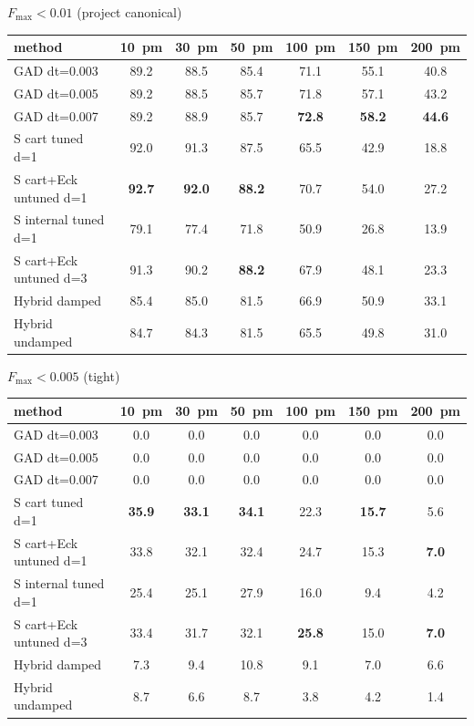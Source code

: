 \documentclass[11pt]{article}
\begin{document}
\begin{center}\footnotesize
\textbf{$F_\mathrm{max}<0.01$} (project canonical)\\[0.3em]
\begin{tabular}{l|cccccc}
\toprule
\textbf{method} & \textbf{10~pm} & \textbf{30~pm} & \textbf{50~pm} & \textbf{100~pm} & \textbf{150~pm} & \textbf{200~pm} \\
\midrule
GAD dt=0.003                   & 89.2 & 88.5 & 85.4 & 71.1 & 55.1 & 40.8 \\
GAD dt=0.005                   & 89.2 & 88.5 & 85.7 & 71.8 & 57.1 & 43.2 \\
GAD dt=0.007                   & 89.2 & 88.9 & 85.7 & \textbf{72.8} & \textbf{58.2} & \textbf{44.6} \\
\midrule
S cart tuned d=1               & 92.0 & 91.3 & 87.5 & 65.5 & 42.9 & 18.8 \\
S cart+Eck untuned d=1         & \textbf{92.7} & \textbf{92.0} & \textbf{88.2} & 70.7 & 54.0 & 27.2 \\
S internal tuned d=1           & 79.1 & 77.4 & 71.8 & 50.9 & 26.8 & 13.9 \\
S cart+Eck untuned d=3         & 91.3 & 90.2 & \textbf{88.2} & 67.9 & 48.1 & 23.3 \\
\midrule
Hybrid damped                  & 85.4 & 85.0 & 81.5 & 66.9 & 50.9 & 33.1 \\
Hybrid undamped                & 84.7 & 84.3 & 81.5 & 65.5 & 49.8 & 31.0 \\
\bottomrule
\end{tabular}
\end{center}

\begin{center}\footnotesize
\textbf{$F_\mathrm{max}<0.005$} (tight)\\[0.3em]
\begin{tabular}{l|cccccc}
\toprule
\textbf{method} & \textbf{10~pm} & \textbf{30~pm} & \textbf{50~pm} & \textbf{100~pm} & \textbf{150~pm} & \textbf{200~pm} \\
\midrule
GAD dt=0.003                   & 0.0 & 0.0 & 0.0 & 0.0 & 0.0 & 0.0 \\
GAD dt=0.005                   & 0.0 & 0.0 & 0.0 & 0.0 & 0.0 & 0.0 \\
GAD dt=0.007                   & 0.0 & 0.0 & 0.0 & 0.0 & 0.0 & 0.0 \\
\midrule
S cart tuned d=1               & \textbf{35.9} & \textbf{33.1} & \textbf{34.1} & 22.3 & \textbf{15.7} & 5.6 \\
S cart+Eck untuned d=1         & 33.8 & 32.1 & 32.4 & 24.7 & 15.3 & \textbf{7.0} \\
S internal tuned d=1           & 25.4 & 25.1 & 27.9 & 16.0 & 9.4 & 4.2 \\
S cart+Eck untuned d=3         & 33.4 & 31.7 & 32.1 & \textbf{25.8} & 15.0 & \textbf{7.0} \\
\midrule
Hybrid damped                  & 7.3 & 9.4 & 10.8 & 9.1 & 7.0 & 6.6 \\
Hybrid undamped                & 8.7 & 6.6 & 8.7 & 3.8 & 4.2 & 1.4 \\
\bottomrule
\end{tabular}
\end{center}
\end{document}
